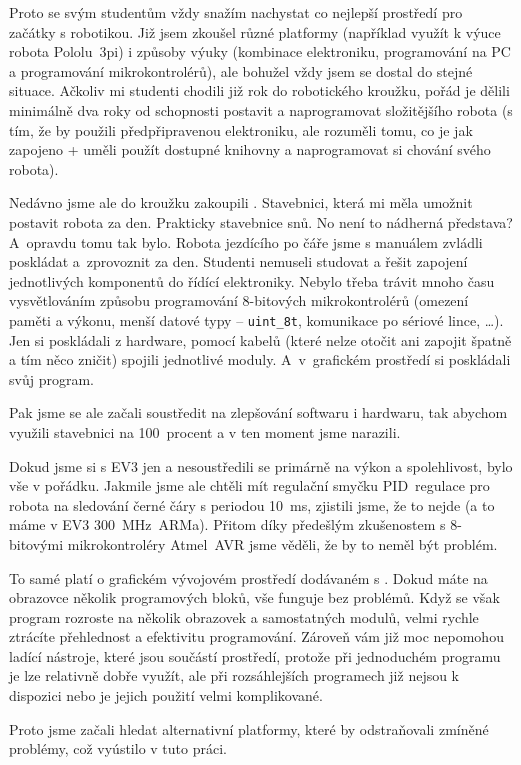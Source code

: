 Proto se svým studentům vždy snažím nachystat co nejlepší prostředí pro začátky s robotikou. 
Již jsem zkoušel různé platformy (například využít k výuce robota Pololu~3pi) i způsoby výuky (kombinace elektroniku, programování na PC a programování mikrokontrolérů), ale bohužel vždy jsem se dostal do stejné situace. 
Ačkoliv mi studenti chodili již rok do robotického kroužku, pořád je dělili minimálně dva roky od schopnosti postavit a naprogramovat složitějšího robota (s tím, že by použili předpřipravenou elektroniku, ale rozuměli tomu, co je jak zapojeno + uměli použít dostupné knihovny a naprogramovat si chování svého robota).

Nedávno jsme ale do kroužku zakoupili \legoEV{}. 
Stavebnici, která mi měla umožnit postavit robota za den. 
Prakticky stavebnice snů. No není to nádherná představa?
A~opravdu tomu tak bylo. Robota jezdícího po čáře jsme s manuálem zvládli poskládat a~zprovoznit za den. 
Studenti nemuseli studovat a řešit zapojení jednotlivých komponentů do řídící elektroniky. 
Nebylo třeba trávit mnoho času vysvětlováním způsobu programování 8-bitových mikrokontrolérů (omezení paměti a výkonu, menší datové typy -- \verb|uint_8t|, komunikace po sériové lince, \dots).
Jen si poskládali z \lega{ }hardware, pomocí kabelů (které nelze otočit ani zapojit špatně a tím něco zničit) spojili jednotlivé moduly. 
A~v~grafickém prostředí si poskládali svůj program.

Pak jsme se ale začali soustředit na zlepšování softwaru i hardwaru, tak abychom využili stavebnici na 100~procent a v ten moment jsme narazili.

Dokud jsme si s EV3 jen  a nesoustředili se primárně na výkon a spolehlivost, bylo vše v pořádku. 
Jakmile jsme ale chtěli mít regulační smyčku PID~regulace pro robota na sledování černé čáry s periodou 10~ms, zjistili jsme, že to nejde (a to máme v EV3  300~MHz~ARMa). Přitom díky předešlým zkušenostem s 8-bitovými mikrokontroléry Atmel~AVR jsme věděli, že by to neměl být problém.

To samé platí o grafickém vývojovém prostředí dodávaném s \EVthree. Dokud máte na obrazovce několik programových bloků, vše funguje bez problémů. 
Když se však program rozroste na několik obrazovek a samostatných modulů, velmi rychle ztrácíte přehlednost a efektivitu programování.
Zároveň vám již moc nepomohou ladící nástroje, které jsou součástí prostředí, protože při jednoduchém programu je lze relativně dobře využít, ale při rozsáhlejších programech již nejsou k dispozici nebo je jejich použití velmi komplikované. 

Proto jsme začali hledat alternativní platformy, které by odstraňovali zmíněné problémy, což vyústilo v tuto práci.   
